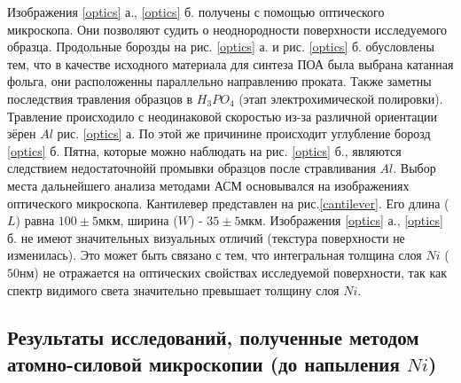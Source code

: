 Изображения \ref{optics} а., \ref{optics} б. получены с помощью оптического микроскопа. Они позволяют судить о неоднородности поверхности исследуемого образца. Продольные борозды на рис. \ref{optics} а. и рис. \ref{optics} б. обусловлены тем, что в качестве исходного материала для синтеза ПОА была выбрана катанная фольга, они расположенны параллельно направлению проката. Также заметны последствия травления образцов в $H_3PO_4$ (этап электрохимической полировки). Травление происходило с неодинаковой скоростью из-за различной ориентации зёрен $Al$ рис. \ref{optics} а. По этой же причинине происходит углубление борозд \ref{optics} б. Пятна, которые можно наблюдать на рис. \ref{optics} б., являются следствием недостаточнойй промывки образцов после стравливания $Al$. Выбор места дальнейшего анализа методами АСМ основывался на изображениях оптического микроскопа. Кантилевер представлен на рис.\ref{cantilever}. Его длина ($L$) равна $100 \pm{5} \text{мкм}$, ширина ($W$) - $35 \pm{5} \text{мкм}$. Изображения \ref{optics} а., \ref{optics} б. не имеют значительных визуальных отличий (текстура поверхности не изменилась). Это может быть связано с тем, что интегральная толщина слоя $Ni$ ($50 \text{нм}$) не отражается на оптических свойствах исследуемой поверхности, так как спектр видимого света значительно превышает толщину слоя $Ni$.

\subsection{Результаты исследований, полученные методом атомно-силовой микроскопии (до напыления $Ni$)}




